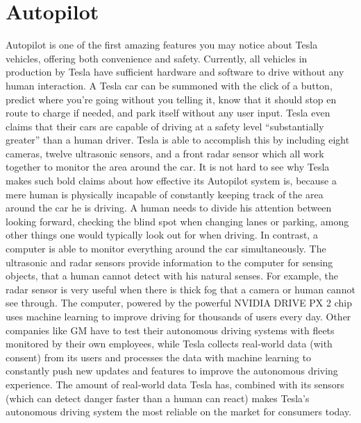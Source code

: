 \documentclass{IEEEtran}
\begin{document}
  \section{Autopilot}
  Autopilot is one of the first amazing features you may notice about Tesla vehicles,
  offering both convenience and safety. Currently, all vehicles in production by Tesla
  have sufficient hardware and software to drive without any human interaction.
  A Tesla car can be summoned with the click of a button, predict where you're
  going without you telling it, know that it should stop en route to charge if needed,
  and park itself without any user input. Tesla even claims that their cars are capable of driving
  at a safety level ``substantially greater'' than a human driver\cite{allcarsautopilot}.
  Tesla is able to accomplish this by including eight cameras, twelve ultrasonic sensors, and a front radar
  sensor which all work together to monitor the area around the car. It is not hard
  to see why Tesla makes such bold claims about how effective its Autopilot system is,
  because a mere human is physically incapable of constantly keeping track of the area around
  the car he is driving. A human needs to divide his attention between looking forward,
  checking the blind spot when changing lanes or parking, among other things one would typically
  look out for when driving. In contrast, a computer is able to monitor everything
  around the car simultaneously. The ultrasonic and radar sensors
  provide information to the computer for sensing objects, that a human cannot
  detect with his natural senses. For example, the radar sensor is very useful when
  there is thick fog that a camera or human cannot see through. The computer, powered
  by the powerful NVIDIA DRIVE PX 2 chip uses machine learning to improve driving for
  thousands of users every day. Other companies like GM have to test their autonomous
  driving systems with fleets monitored by their own employees, while Tesla collects
  real-world data (with consent) from its users and processes the data with machine
  learning to constantly push new updates and features to improve the autonomous
  driving experience.\cite{tdata1}\cite{tdata2}\cite{tdata3}
  The amount of real-world data Tesla has, combined with its sensors (which can
  detect danger faster than a human can react\cite{predictcrash}) makes Tesla's
  autonomous driving system the most reliable on the market for consumers today.

\end{document}
